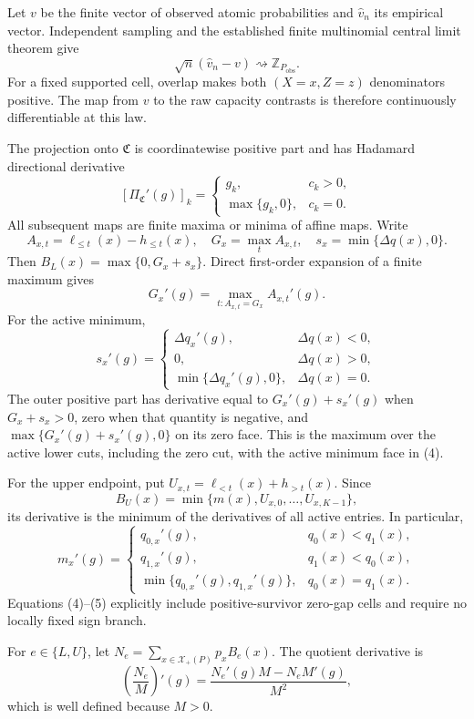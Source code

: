 Let \(v\) be the finite vector of observed atomic probabilities and \(\widehat v_n\) its empirical vector.  Independent sampling and the established finite multinomial central limit theorem give
\[
\sqrt n(\widehat v_n-v)\rightsquigarrow\mathbb Z_{P_{\mathrm{obs}}}.
\tag{1}
\]
For a fixed supported cell, overlap makes both \((X=x,Z=z)\) denominators positive.  The map from \(v\) to the raw capacity contrasts is therefore continuously differentiable at this law.

The projection onto \(\mathfrak C\) is coordinatewise positive part and has Hadamard directional derivative
\[
[\Pi_{\mathfrak C}'(g)]_k=
\begin{cases}
g_k,&c_k>0,\\
\max\{g_k,0\},&c_k=0.
\end{cases}
\tag{2}
\]
All subsequent maps are finite maxima or minima of affine maps.  Write
\[
A_{x,t}=\ell_{\le t}(x)-h_{\le t}(x),\quad
G_x=\max_t A_{x,t},\quad
s_x=\min\{\Delta q(x),0\}.
\]
Then \(B_L(x)=\max\{0,G_x+s_x\}\).  Direct first-order expansion of a finite maximum gives
\[
G_x'(g)=\max_{t:A_{x,t}=G_x}A_{x,t}'(g).
\tag{3}
\]
For the active minimum,
\[
s_x'(g)=
\begin{cases}
\Delta q_x'(g),&\Delta q(x)<0,\\
0,&\Delta q(x)>0,\\
\min\{\Delta q_x'(g),0\},&\Delta q(x)=0.
\end{cases}
\tag{4}
\]
The outer positive part has derivative equal to \(G_x'(g)+s_x'(g)\) when \(G_x+s_x>0\), zero when that quantity is negative, and \(\max\{G_x'(g)+s_x'(g),0\}\) on its zero face.  This is the maximum over the active lower cuts, including the zero cut, with the active minimum face in (4).

For the upper endpoint, put \(U_{x,t}=\ell_{<t}(x)+h_{>t}(x)\).  Since
\[
B_U(x)=\min\{m(x),U_{x,0},\ldots,U_{x,K-1}\},
\]
its derivative is the minimum of the derivatives of all active entries.  In particular,
\[
m_x'(g)=
\begin{cases}
q_{0,x}'(g),&q_0(x)<q_1(x),\\
q_{1,x}'(g),&q_1(x)<q_0(x),\\
\min\{q_{0,x}'(g),q_{1,x}'(g)\},&q_0(x)=q_1(x).
\end{cases}
\tag{5}
\]
Equations (4)--(5) explicitly include positive-survivor zero-gap cells and require no locally fixed sign branch.

For \(e\in\{L,U\}\), let \(N_e=\sum_{x\in\mathcal X_+(P)}p_xB_e(x)\).  The quotient derivative is
\[
\left(\frac{N_e}{M}\right)'(g)=\frac{N_e'(g)M-N_eM'(g)}{M^2},
\tag{6}
\]
which is well defined because \(M>0\).

